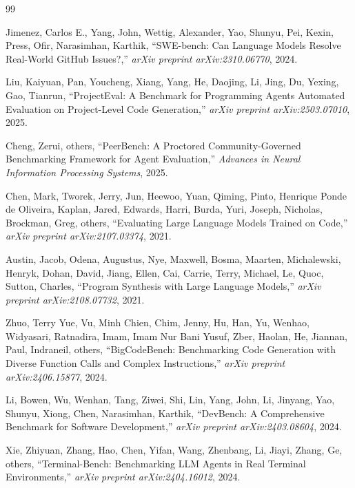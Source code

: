 \documentclass[letterpaper, 10 pt, conference]{ieeeconf}
\begin{document}
\begin{thebibliography}{99}

Jimenez, Carlos E., Yang, John, Wettig, Alexander, Yao, Shunyu, Pei, Kexin, Press, Ofir, Narasimhan, Karthik, ``{SWE}-bench: Can Language Models Resolve Real-World {GitHub} Issues?,'' \emph{arXiv preprint arXiv:2310.06770}, 2024.

Liu, Kaiyuan, Pan, Youcheng, Xiang, Yang, He, Daojing, Li, Jing, Du, Yexing, Gao, Tianrun, ``{ProjectEval}: A Benchmark for Programming Agents Automated Evaluation on Project-Level Code Generation,'' \emph{arXiv preprint arXiv:2503.07010}, 2025.

Cheng, Zerui, others, ``{PeerBench}: A Proctored Community-Governed Benchmarking Framework for Agent Evaluation,'' \emph{Advances in Neural Information Processing Systems}, 2025.

Chen, Mark, Tworek, Jerry, Jun, Heewoo, Yuan, Qiming, Pinto, Henrique Ponde de Oliveira, Kaplan, Jared, Edwards, Harri, Burda, Yuri, Joseph, Nicholas, Brockman, Greg, others, ``Evaluating Large Language Models Trained on Code,'' \emph{arXiv preprint arXiv:2107.03374}, 2021.

Austin, Jacob, Odena, Augustus, Nye, Maxwell, Bosma, Maarten, Michalewski, Henryk, Dohan, David, Jiang, Ellen, Cai, Carrie, Terry, Michael, Le, Quoc, Sutton, Charles, ``Program Synthesis with Large Language Models,'' \emph{arXiv preprint arXiv:2108.07732}, 2021.

Zhuo, Terry Yue, Vu, Minh Chien, Chim, Jenny, Hu, Han, Yu, Wenhao, Widyasari, Ratnadira, Imam, Imam Nur Bani Yusuf, Zber, Haolan, He, Jiannan, Paul, Indraneil, others, ``{BigCodeBench}: Benchmarking Code Generation with Diverse Function Calls and Complex Instructions,'' \emph{arXiv preprint arXiv:2406.15877}, 2024.

Li, Bowen, Wu, Wenhan, Tang, Ziwei, Shi, Lin, Yang, John, Li, Jinyang, Yao, Shunyu, Xiong, Chen, Narasimhan, Karthik, ``{DevBench}: A Comprehensive Benchmark for Software Development,'' \emph{arXiv preprint arXiv:2403.08604}, 2024.

Xie, Zhiyuan, Zhang, Hao, Chen, Yifan, Wang, Zhenbang, Li, Jiayi, Zhang, Ge, others, ``{Terminal-Bench}: Benchmarking LLM Agents in Real Terminal Environments,'' \emph{arXiv preprint arXiv:2404.16012}, 2024.


\end{thebibliography}
\end{document}
